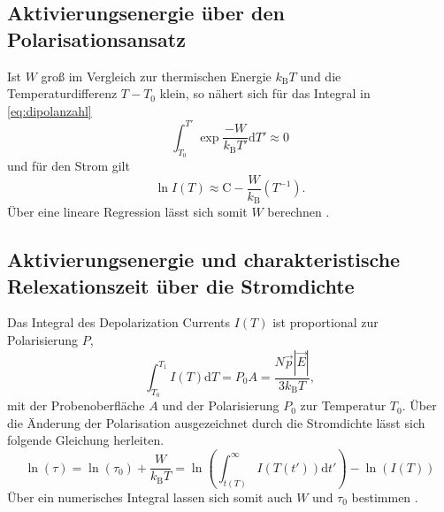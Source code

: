 \subsection{Aktivierungsenergie über den Polarisationsansatz}

Ist $W$ groß im Vergleich zur thermischen Energie $k_\text{B}T$ und die Temperaturdifferenz $T - T_0$ klein, so nähert sich für das Integral in \autoref{eq:dipolanzahl}
\begin{equation*}
    \int_{T_0}^{T'} \exp{\frac{-W}{k_\text{B}T'} \mathrm{d}}T' \approx 0
\end{equation*}
und für den Strom gilt
\begin{equation}
    \ln{I\left(T\right)} \approx \text{C} - \frac{W}{k_\text{B}} \left(T^{-1}\right).
    \label{eq:fit_polarisationsansatz}
\end{equation}
Über eine lineare Regression lässt sich somit $W$ berechnen \cite{fuller}. 





\subsection{Aktivierungsenergie und charakteristische Relexationszeit über die Stromdichte}
Das Integral des Depolarization Currents $I(T)$ ist proportional zur Polarisierung $P$,
\begin{equation*}
    \int_{T_0}^{T_1} I\left(T\right) \mathrm{d}T = P_0 A = \frac{N \vec{p} \left\lvert \vec{E} \right\rvert}{3k_\text{B}T},
\end{equation*}
mit der Probenoberfläche $A$ und der Polarisierung $P_0$ zur Temperatur $T_0$. Über die Änderung der Polarisation 
ausgezeichnet durch die Stromdichte lässt sich folgende Gleichung herleiten.
\begin{equation}
    \ln\left(\tau\right) = \ln\left(\tau_0\right) + \frac{W}{k_\text{B}T} = \ln\left(\int_{t(T)}^{\infty} I(T(t'))\mathrm{d}t'\right) - \ln\left(I(T)\right)
    \label{eq:fit_stromdichtenansatz}
\end{equation}
Über ein numerisches Integral lassen sich somit auch $W$ und $\tau_0$ bestimmen \cite{fuller}.